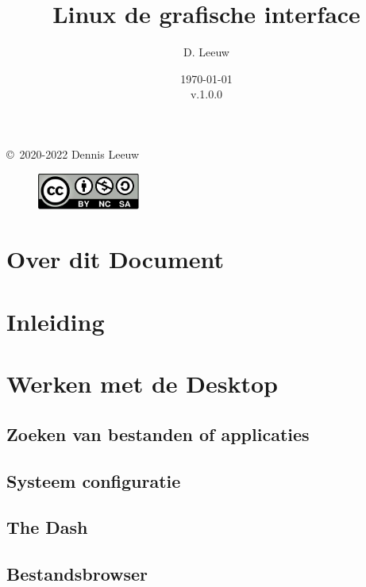 \documentclass[a4paper,12pt,twoside,openright,titlepage]{book}
\author{D. Leeuw}
\title{Linux de grafische interface}
\date{\today\\v.1.0.0}
\begin{document}

\maketitle

\copyright\ 2020-2022 Dennis Leeuw\\

\begin{figure}
\includegraphics[width=0.3\textwidth]{linuxreader-img001.png}
\end{figure}

\bigskip




\frontmatter
\chapter{Over dit Document}



\tableofcontents

\mainmatter
\chapter{Inleiding}



\chapter{Werken met de Desktop}

\section{Zoeken van bestanden of applicaties}

\section{Systeem configuratie}

\section{The Dash}

\section{Bestandsbrowser}

\end{document}
